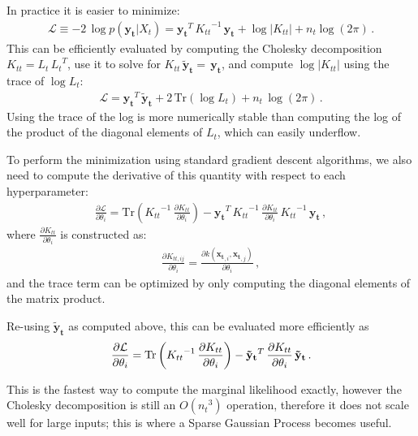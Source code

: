 \documentclass[11pt,a4paper]{article}
\newcommand{\abs}[1]{\left| #1 \right|}
\newcommand{\tr}{\text{Tr}}
\numberwithin{equation}{section}
\begin{document}
In practice it is easier to minimize:
\begin{align}
\mathcal{L} \equiv -2\,\log p(\mathbf{y_t} | X_t) = \mathbf{y_t}^T\,{K_{tt}}^{-1}\,\mathbf{y_t} + \log \abs{K_{tt}} + n_t\log(2\pi)\,.
\end{align}
This can be efficiently evaluated by computing the Cholesky decomposition $K_{tt} = L_t\,{L_t}^T$, use it to solve for ${K_{tt}}\,\mathbf{\tilde{y}_t} = \,\mathbf{y_t}$, and compute $\log \abs{K_{tt}}$ using the trace of $\log L_t$:
\begin{align}
\mathcal{L} = \mathbf{y_t}^T\,\mathbf{\tilde{y}_t} + 2\,\tr\left(\log L_t\right) + n_t\,\log(2\pi)\,.
\end{align}
Using the trace of the log is more numerically stable than computing the log of the product of the diagonal elements of $L_t$, which can easily underflow.

To perform the minimization using standard gradient descent algorithms, we also need to compute the derivative of this quantity with respect to each hyperparameter:
\begin{align}
\frac{\partial \mathcal{L}}{\partial \theta_i} = \tr\left({K_{tt}}^{-1}\,\frac{\partial K_{tt}}{\partial \theta_i}\right) - \mathbf{y_t}^T\,{K_{tt}}^{-1}\,\frac{\partial K_{tt}}{\partial \theta_i}\,{K_{tt}}^{-1}\,\mathbf{y_t}\,,
\end{align}
where $\frac{\partial K_{tt}}{\partial \theta_i}$ is constructed as:
\begin{align}
\frac{\partial K_{tt,ij}}{\partial \theta_i} = \frac{\partial k(\mathbf{x_t}_{,i},\mathbf{x_t}_{,j})}{\partial \theta_i}\,,
\end{align}
and the trace term can be optimized by only computing the diagonal elements of the matrix product.

Re-using $\mathbf{\tilde{y}_t}$ as computed above, this can be evaluated more efficiently as
\begin{align}
\frac{\partial \mathcal{L}}{\partial \theta_i} = \tr\left({K_{tt}}^{-1}\,\frac{\partial K_{tt}}{\partial \theta_i}\right) - {\mathbf{\tilde{y}_t}}\mkern 0mu^T\,\frac{\partial K_{tt}}{\partial \theta_i}\,\mathbf{\tilde{y}_t}\,.
\end{align}

This is the fastest way to compute the marginal likelihood exactly, however the Cholesky decomposition is still an $O({n_t}^3)$ operation, therefore it does not scale well for large inputs; this is where a Sparse Gaussian Process becomes useful.
\end{document}
